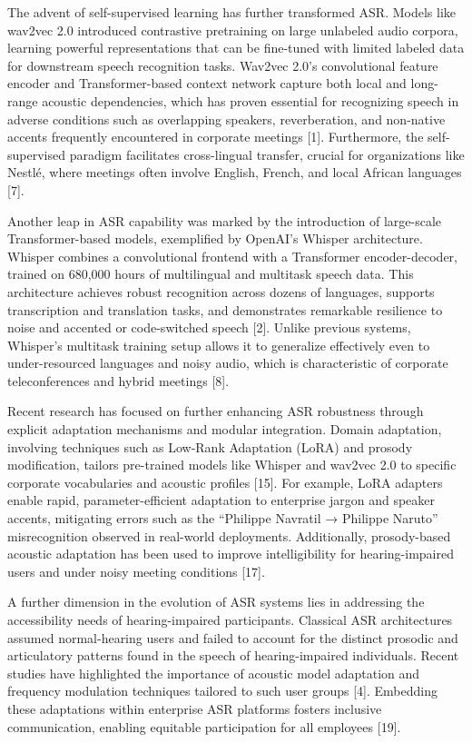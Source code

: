 \documentclass[12pt,a4paper]{article}
\begin{document}
The advent of self-supervised learning has further transformed ASR. Models like wav2vec 2.0 introduced contrastive pretraining on large unlabeled audio corpora, learning powerful representations that can be fine-tuned with limited labeled data for downstream speech recognition tasks. Wav2vec 2.0’s convolutional feature encoder and Transformer-based context network capture both local and long-range acoustic dependencies, which has proven essential for recognizing speech in adverse conditions such as overlapping speakers, reverberation, and non-native accents frequently encountered in corporate meetings [1]. Furthermore, the self-supervised paradigm facilitates cross-lingual transfer, crucial for organizations like Nestlé, where meetings often involve English, French, and local African languages [7].


Another leap in ASR capability was marked by the introduction of large-scale Transformer-based models, exemplified by OpenAI’s Whisper architecture. Whisper combines a convolutional frontend with a Transformer encoder-decoder, trained on 680,000 hours of multilingual and multitask speech data. This architecture achieves robust recognition across dozens of languages, supports transcription and translation tasks, and demonstrates remarkable resilience to noise and accented or code-switched speech [2]. Unlike previous systems, Whisper’s multitask training setup allows it to generalize effectively even to under-resourced languages and noisy audio, which is characteristic of corporate teleconferences and hybrid meetings [8].


Recent research has focused on further enhancing ASR robustness through explicit adaptation mechanisms and modular integration. Domain adaptation, involving techniques such as Low-Rank Adaptation (LoRA) and prosody modification, tailors pre-trained models like Whisper and wav2vec 2.0 to specific corporate vocabularies and acoustic profiles [15]. For example, LoRA adapters enable rapid, parameter-efficient adaptation to enterprise jargon and speaker accents, mitigating errors such as the “Philippe Navratil → Philippe Naruto” misrecognition observed in real-world deployments. Additionally, prosody-based acoustic adaptation has been used to improve intelligibility for hearing-impaired users and under noisy meeting conditions [17].


A further dimension in the evolution of ASR systems lies in addressing the accessibility needs of hearing-impaired participants. Classical ASR architectures assumed normal-hearing users and failed to account for the distinct prosodic and articulatory patterns found in the speech of hearing-impaired individuals. Recent studies have highlighted the importance of acoustic model adaptation and frequency modulation techniques tailored to such user groups [4]. Embedding these adaptations within enterprise ASR platforms fosters inclusive communication, enabling equitable participation for all employees [19].
\end{document}
